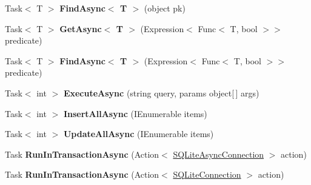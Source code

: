 \begin{DoxyCompactItemize}
\item 
\hypertarget{classSQLite_1_1SQLiteAsyncConnection_a4e09e6aacf646853516ab1befea4ac4b}{Task$<$ T $>$ {\bfseries Find\-Async$<$ T $>$} (object pk)}\label{classSQLite_1_1SQLiteAsyncConnection_a4e09e6aacf646853516ab1befea4ac4b}

\item 
\hypertarget{classSQLite_1_1SQLiteAsyncConnection_ad3e092c3fee0a61611570e8e86dbb88e}{Task$<$ T $>$ {\bfseries Get\-Async$<$ T $>$} (Expression$<$ Func$<$ T, bool $>$$>$ predicate)}\label{classSQLite_1_1SQLiteAsyncConnection_ad3e092c3fee0a61611570e8e86dbb88e}

\item 
\hypertarget{classSQLite_1_1SQLiteAsyncConnection_ab3ee9b32ac49766e4ac20fa697e91f99}{Task$<$ T $>$ {\bfseries Find\-Async$<$ T $>$} (Expression$<$ Func$<$ T, bool $>$$>$ predicate)}\label{classSQLite_1_1SQLiteAsyncConnection_ab3ee9b32ac49766e4ac20fa697e91f99}

\item 
\hypertarget{classSQLite_1_1SQLiteAsyncConnection_aa61f9b65944e23c32cac8b0e2c39d597}{Task$<$ int $>$ {\bfseries Execute\-Async} (string query, params object\mbox{[}$\,$\mbox{]} args)}\label{classSQLite_1_1SQLiteAsyncConnection_aa61f9b65944e23c32cac8b0e2c39d597}

\item 
\hypertarget{classSQLite_1_1SQLiteAsyncConnection_a8caf48d01bf96785143e71ee6a12b6a0}{Task$<$ int $>$ {\bfseries Insert\-All\-Async} (I\-Enumerable items)}\label{classSQLite_1_1SQLiteAsyncConnection_a8caf48d01bf96785143e71ee6a12b6a0}

\item 
\hypertarget{classSQLite_1_1SQLiteAsyncConnection_a42b8f062eb54f8649a2ccff9984b536e}{Task$<$ int $>$ {\bfseries Update\-All\-Async} (I\-Enumerable items)}\label{classSQLite_1_1SQLiteAsyncConnection_a42b8f062eb54f8649a2ccff9984b536e}

\item 
\hypertarget{classSQLite_1_1SQLiteAsyncConnection_affd521039f3a7da49746af600522c809}{Task {\bfseries Run\-In\-Transaction\-Async} (Action$<$ \hyperlink{classSQLite_1_1SQLiteAsyncConnection}{S\-Q\-Lite\-Async\-Connection} $>$ action)}\label{classSQLite_1_1SQLiteAsyncConnection_affd521039f3a7da49746af600522c809}

\item 
\hypertarget{classSQLite_1_1SQLiteAsyncConnection_a0d8abe01ee8f0afe93b6a38423d77029}{Task {\bfseries Run\-In\-Transaction\-Async} (Action$<$ \hyperlink{classSQLite_1_1SQLiteConnection}{S\-Q\-Lite\-Connection} $>$ action)}\label{classSQLite_1_1SQLiteAsyncConnection_a0d8abe01ee8f0afe93b6a38423d77029}


\end{DoxyCompactItemize}
